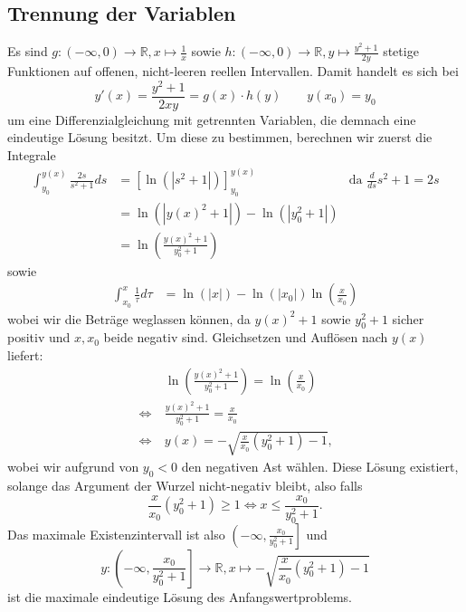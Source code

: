 \documentclass[a4paper]{article}
\begin{document}
\makeexheaderger

\subsection{Trennung der Variablen}

Es sind $g: (-\infty, 0) \to \mathds{R}, x \mapsto \frac{1}{x}$ sowie $h: (-\infty, 0) \to \mathds{R}, y \mapsto \frac{y^2+1}{2y}$ stetige Funktionen auf offenen, nicht-leeren reellen Intervallen. Damit handelt es sich bei
\begin{equation*}
	y'(x) = \frac{y^2 + 1}{2xy} = g(x) \cdot h(y) \qquad y(x_0) = y_0
\end{equation*}
um eine Differenzialgleichung mit getrennten Variablen, die demnach eine eindeutige Lösung besitzt. Um diese zu bestimmen, berechnen wir zuerst die Integrale
\begin{align*}
	\int_{y_0}^{y(x)} \frac{2s}{s^2 + 1} ds & = \left[ \ln(|s^2 + 1|) \right]_{y_0}^{y(x)}   & \text{da } \frac{d}{ds} s^2 + 1 = 2s \\
	                                        & = \ln(|y(x)^2 + 1|) - \ln(|y_0^2 + 1|)                                                \\
	                                        & = \ln\left(\frac{y(x)^2 + 1}{y_0^2 + 1}\right)
\end{align*}
sowie
\begin{align*}
	\int_{x_0}^{x} \frac{1}{\tau} d\tau & = \ln(|x|) - \ln(|x_0|) \ln\left(\frac{x}{x_0}\right)
\end{align*}
wobei wir die Beträge weglassen können, da $y(x)^2 + 1$ sowie $y_0^2 + 1$ sicher positiv und $x,x_0$ beide negativ sind. Gleichsetzen und Auflösen nach $y(x)$ liefert:
\begin{align*}
	       & \ln\left(\frac{y(x)^2 + 1}{y_0^2 + 1}\right) = \ln\left(\frac{x}{x_0}\right) \\
	\iff\  & \frac{y(x)^2 + 1}{y_0^2 + 1} = \frac{x}{x_0}                                 \\
	\iff\  & y(x) = - \sqrt{\frac{x}{x_0} (y_0^2 + 1) - 1}\text{,}
\end{align*}
wobei wir aufgrund von $y_0 < 0$ den negativen Ast wählen. Diese Lösung existiert, solange das Argument der Wurzel nicht-negativ bleibt, also falls
\begin{equation*}
	\frac{x}{x_0} (y_0^2 + 1) \geq 1 \iff x \leq \frac{x_0}{y_0^2 + 1}\text{.}
\end{equation*}
Das maximale Existenzintervall ist also $\left(-\infty, \frac{x_0}{y_0^2 + 1}\right]$ und
\begin{equation*}
	y: \left(-\infty, \frac{x_0}{y_0^2 + 1}\right] \to \mathds{R}, x \mapsto  -\sqrt{\frac{x}{x_0} (y_0^2 + 1) - 1}
\end{equation*}
ist die maximale eindeutige Lösung des Anfangswertproblems.
\end{document}
